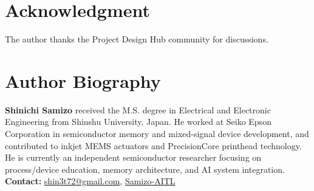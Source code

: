 \documentclass[conference]{IEEEtran}
\begin{document}
\section*{Acknowledgment}
The author thanks the Project Design Hub community for discussions.




\section*{Author Biography}
\noindent\textbf{Shinichi Samizo}
received the M.S. degree in Electrical and Electronic Engineering 
from Shinshu University, Japan.  
He worked at Seiko Epson Corporation in semiconductor memory and 
mixed-signal device development, and contributed to inkjet MEMS actuators 
and PrecisionCore printhead technology.  
He is currently an independent semiconductor researcher focusing on 
process/device education, memory architecture, and AI system integration.\\[2pt]
\textbf{Contact:} \href{mailto:shin3t72@gmail.com}{shin3t72@gmail.com}, 
\href{https://github.com/Samizo-AITL}{Samizo-AITL}
\end{document}
